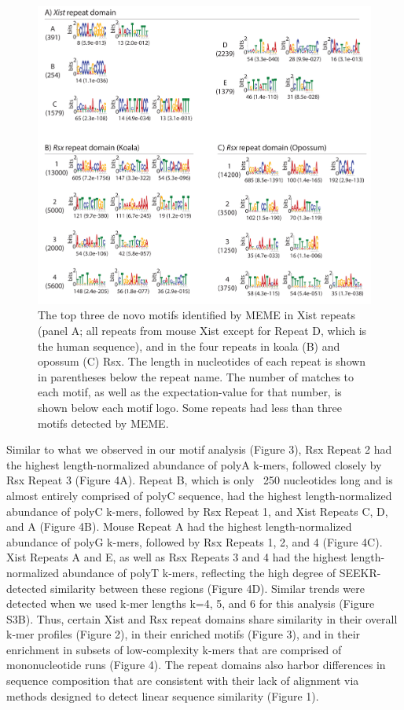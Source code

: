 \begin{figure}[p]
\centering
\includegraphics[angle=0, width=\textwidth]{images/fig3_v3-01.pdf}
\caption[Motif analysis of \emph{Xist} and \emph{Rsx}]{The top three de novo motifs identified by MEME in Xist repeats (panel A; all repeats from mouse Xist except for Repeat D, which is the human sequence), and in the four repeats in koala (B) and opossum (C) Rsx. The length in nucleotides of each repeat is shown in parentheses below the repeat name. The number of matches to each motif, as well as the expectation-value for that number, is shown below each motif logo. Some repeats had less than three motifs detected by MEME.}
\end{figure}
Similar to what we observed in our motif analysis (Figure 3), Rsx Repeat 2 had the highest length-normalized abundance of polyA k-mers, followed closely by Rsx Repeat 3 (Figure 4A). Repeat B, which is only ~250 nucleotides long and is almost entirely comprised of polyC sequence, had the highest length-normalized abundance of polyC k-mers, followed by Rsx Repeat 1, and Xist Repeats C, D, and A (Figure 4B). Mouse Repeat A had the highest length-normalized abundance of polyG k-mers, followed by Rsx Repeats 1, 2, and 4 (Figure 4C). Xist Repeats A and E, as well as Rsx Repeats 3 and 4 had the highest length-normalized abundance of polyT k-mers, reflecting the high degree of SEEKR-detected similarity between these regions (Figure 4D). Similar trends were detected when we used k-mer lengths k=4, 5, and 6 for this analysis (Figure S3B). Thus, certain Xist and Rsx repeat domains share similarity in their overall k-mer profiles (Figure 2), in their enriched motifs (Figure 3), and in their enrichment in subsets of low-complexity k-mers that are comprised of mononucleotide runs (Figure 4). The repeat domains also harbor differences in sequence composition that are consistent with their lack of alignment via methods designed to detect linear sequence similarity (Figure 1).


